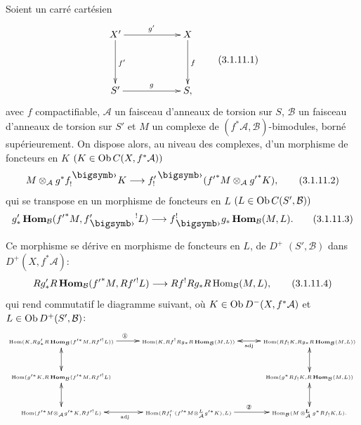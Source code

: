 \documentclass[10pt]{../fichiers-configuration-latex/smfart}
\begin{document}
\subsubsection{}
Soient un carré cartésien
\begin{equation*}
\vcenter{
\xymatrix@C=2cm@R=1.5cm{
X' \ar[r]^{g'}\ar[d]^{f'}& X\ar[d]^{f}\\
S' \ar[r]^{g} & S,
}}\tag{3.1.11.1}
\end{equation*}%
avec $f$ compactifiable, $\mathcal{A}$ un faisceau d'anneaux de
torsion sur $S$, $\mathcal{B}$ un faisceau d'anneaux de torsion sur
$S'$ et $M$ un complexe de
$(f^{\ast}\mathcal{A},\mathcal{B})$-bimodules, borné supérieurement. On dispose alors, au niveau des
complexes, d'un morphisme de foncteurs en $K$ $(K\in \operatorname{Ob}
C(X,f^{\ast}\mathcal{A}))$
\begin{equation*}
M\otimes_{\mathcal{A}}g^{\ast}f^{\bigdot}_{!}K\longrightarrow
f'_{!}{}^{\bigdot}
({f'}^{\ast}M\otimes_{\mathcal{A}}{g'}^{\ast}K){\quoi},\tag{3.1.11.2}
\end{equation*}%
qui se transpose en un morphisme de foncteurs en $L$ $(L\in \operatorname{Ob}
C(S',\mathcal{B}))$
\begin{equation*}
g'_{\ast}\Hhom_{\mathcal{B}}({f'}^{\ast}M,f'_{\bigdot}{}^{!}L)\longrightarrow
f^{!}_{\bigdot}g_\ast\Hhom_{\mathcal{B}}(M,L){\quoi}.\tag{3.1.11.3}
\end{equation*}

Ce morphisme se dérive en morphisme de foncteurs en $L$, de $D^{+}$
$(S',\mathcal{B})$ dans $D^{+}(X,f^{\ast}\mathcal{A})$:
\begin{equation*}
Rg'_{\ast}R\operatorname{\mathbf{Hom}}_{\mathcal{B}}({f'}^{\ast}M,Rf'{}^{!}L)\longrightarrow
Rf^{!}Rg_{\ast}R\operatorname{Hom}_{\mathcal{B}}(M,L){},\tag{3.1.11.4}
\end{equation*}%
qui rend commutatif le diagramme suivant, où $K\in \operatorname{Ob}
D^{-}(X,f^{\ast}\mathcal{A})$ et $L\in \operatorname{Ob} D^{+}(S',\mathcal{B})$:
$$
\xymatrix{
\scriptscriptstyle{\Hom(K,Rg'_{\ast} R\Hhom_{\Bb}(f'^{\ast}M,Rf'^{!}L))}
\ar@{<->}[d] \ar[r]^{\text{\ding{172}}} &
\scriptscriptstyle{\Hom(K,Rf^{!}Rg_{\ast}R\Hhom_{\Bb}(M,L))}
\ar@{<->}[r]_{{\scriptscriptstyle{\rm adj}}}& \scriptscriptstyle{\Hom(Rf_!K, Rg_{\ast}
R\Hhom_{\Bb}(M,L))}\ar@{<->}[d]\\
\scriptscriptstyle{\Hom(g'^{\ast}K,R\Hhom_{\Bb}(f'^{\ast} M, Rf'^{!}L)}\ar@{<->}[d] 
& &  \scriptscriptstyle{\Hom(g^{\ast}Rf_! K, R\Hhom_{\Bb} (M,L))} \ar@{<->}[d]\\
\scriptscriptstyle{\Hom(f'^{\ast}M\otimes_{\Aa}g'^{\ast}K,
Rf'^{!}L)} \ar@{<->}[r]_{\scriptscriptstyle{\rm adj}}& \scriptscriptstyle{\Hom(Rf'^{\cdot}_!(f'^{\ast}M\otimes^{L}_\Aa
g'^{\ast}K),L)}
\ar[r]^{\text{\ding{173}}} &
\scriptscriptstyle{\Hom_{\Bb}(M\mathop{\otimes}^{\LL}_\Aa g^{\ast}Rf_!K, L)}.
}
$$
\end{document}
